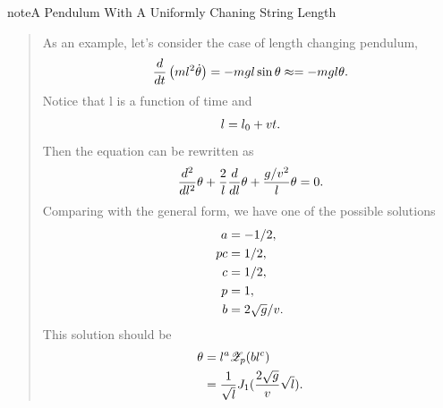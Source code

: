 \documentclass[letterpaper,10pt,english]{sphinxmanual}
\begin{document}
\begin{notice}{note}{A Pendulum With A Uniformly Chaning String Length}
\begin{quote}

As an example, let's consider the case of length changing pendulum,
\begin{gather}
\begin{split}\frac{d}{dt} \left( m l^2 \dot{\theta}\right) = - m g l \sin\theta \approx = - m g l \theta.\end{split}\notag
\end{gather}
Notice that l is a function of time and
\begin{gather}
\begin{split}l = l_0 + v t.\end{split}\notag
\end{gather}
Then the equation can be rewritten as
\begin{gather}
\begin{split}\frac{d^2}{dl^2}\theta  + \frac{2}{l} \frac{d}{dl} \theta + \frac{g/v^2}{l} \theta  = 0.\end{split}\notag
\end{gather}
Comparing with the general form, we have one of the possible solutions
\begin{gather}
\begin{split}a & = -1/2, \\
pc & = 1/2, \\
c & = 1/2, \\
p & = 1, \\
b & = 2\sqrt{g}/v.\end{split}\notag
\end{gather}
This solution should be
\begin{gather}
\begin{split}\theta  &=  l^a \mathscr{Z}_p(b l^c) \\
& = \frac{1}{\sqrt{l}} J_1(\frac{2\sqrt{g}}{v} \sqrt{l}).\end{split}\notag
\end{gather}\end{quote}
\end{notice}
\end{document}
